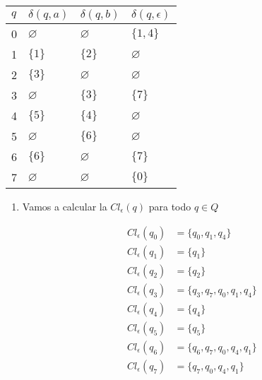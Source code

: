 \documentclass{article}
\begin{document}
\begin{enumerate}
{    		\begin{table}[H]
    			\centering
    			\begin{tabular}{|l|l|l|l|}
    				\hline
    				$q$ & $\delta (q,a)$ & $\delta (q,b)$ & $\delta (q, \epsilon)$ \\ \hline
    				0                           & $\varnothing$                          & $\varnothing$                          & $\{1,4\}$                                      \\ \hline
    				1                           & $\{1\}$                                & $\{2\}$                                & $\varnothing$                                  \\ \hline
    				2                           & $\{3\}$                                & $\varnothing$                          & $\varnothing$                                  \\ \hline
    				3                           & $\varnothing$                          & $\{3\}$                                & $\{7\}$                                        \\ \hline
    				4                           & $\{5\}$                                & $\{4\}$                                & $\varnothing$                                  \\ \hline
    				5                           & $\varnothing$                          & $\{6\}$                                & $\varnothing$                                  \\ \hline
    				6                           & $\{6\}$                                & $\varnothing$                          & $\{7\}$                                        \\ \hline
    				7                           & $\varnothing$                          & $\varnothing$                          & $\{0\}$                                        \\ \hline
    			\end{tabular}
    		\end{table}
    		
    		\begin{enumerate}
				\item{
				
				Vamos a calcular la $Cl_{\epsilon} (q)$ para todo $q \in Q$
				
				\begin{align*}
					Cl_{\epsilon} (q_{0}) & =  \{q_{0}, q_{1}, q_{4}\}\\
					Cl_{\epsilon} (q_{1}) & =  \{q_{1}\}\\
					Cl_{\epsilon} (q_{2}) & =  \{q_{2}\}\\
					Cl_{\epsilon} (q_{3}) & =  \{q_{3}, q_{7}, q_{0}, q_{1}, q_{4}\}\\
					Cl_{\epsilon} (q_{4}) & =  \{q_{4}\}\\
					Cl_{\epsilon} (q_{5}) & =  \{q_{5}\}\\
					Cl_{\epsilon} (q_{6}) & =  \{q_{6}, q_{7}, q_{0}, q_{4}, q_{1}\}\\
					Cl_{\epsilon} (q_{7}) & =  \{q_{7}, q_{0}, q_{4}, q_{1}\}
				\end{align*}
				
}
\end{enumerate}}
\end{enumerate}
\end{document}
